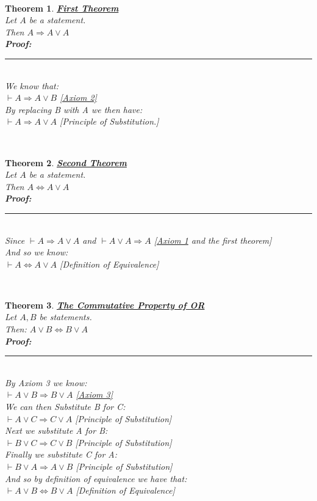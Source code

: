 \documentclass[12pt]{extarticle}
\theoremstyle{plain}
\newtheorem{thm}{Theorem}[section]
\theoremstyle{plain}
\theoremstyle{plain}
\theoremstyle{Definition}
\theoremstyle{Definition}
\theoremstyle{plain}
\theoremstyle{plain}
\newcommand{\cut}[0]{\noindent\framebox[\linewidth]{\rule{\linewidth}{2pt}}\\}
\newcommand{\prof}[0]{	\noindent \textbf{Proof:} \rule{500pt}{2pt} \\ }
\begin{document}
\cut
\begin{thm} \underline{\textbf{First Theorem}} \\ 
	Let $A$ be a statement. \\ 
	Then $A \Rightarrow A \lor A $ \\ 
	\prof
	We know that: \\ 
	$\vdash A \Rightarrow A \lor B$ \hfill \hyperlink{Axioms}{[Axiom 2]}\\ 
	By replacing B with A we then have: \\ 
	$\vdash A \Rightarrow A \lor A$ \hfill [Principle of Substitution.] 
\end{thm}
\cut
\begin{thm} \underline{\textbf{Second Theorem}} \\
	Let $A$ be a statement. \\ 
	Then $A \Leftrightarrow A \lor A $ \\ 	
	\prof
	Since $\vdash A \Rightarrow A \lor A$ and $\vdash A \lor A \Rightarrow A$ \hfill [\hyperlink{Axioms}{Axiom 1} and the first theorem]\\
	And so we know: \\
	$\vdash A \Leftrightarrow A \lor A$ \hfill [Definition of Equivalence]
\end{thm}
\cut
\begin{thm} \underline{\textbf{The Commutative Property of OR}} \\
	Let $A,B$ be statements. \\
	Then: $A \lor B \Leftrightarrow B \lor A$ \\ 
	\prof
	By Axiom 3 we know: \\ 
	$\vdash A \lor B \Rightarrow B \lor A$ \hfill \hyperlink{Axioms}{[Axiom 3]} \\
	We can then Substitute B for C: \\
	$\vdash A \lor C \Rightarrow C \lor A$ \hfill [Principle of Substitution] \\
	Next we substitute A for B: \\ 
	$\vdash B \lor C \Rightarrow C \lor B$ \hfill [Principle of Substitution] \\
	Finally we substitute C for A: \\ 
	$\vdash B \lor A \Rightarrow A \lor B$ \hfill [Principle of Substitution] \\
	And so by definition of equivalence we have that: \\
	$\vdash A \lor B \Leftrightarrow B \lor A$ \hfill [Definition of Equivalence]
\end{thm}
\end{document}
